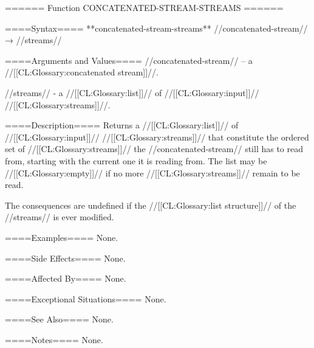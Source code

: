 ====== Function CONCATENATED-STREAM-STREAMS ======

====Syntax====
**concatenated-stream-streams** //concatenated-stream// → //streams//

====Arguments and Values====
//concatenated-stream// -- a //[[CL:Glossary:concatenated stream]]//.

//streams// - a //[[CL:Glossary:list]]// of //[[CL:Glossary:input]]// //[[CL:Glossary:streams]]//.

====Description====
Returns a //[[CL:Glossary:list]]// of //[[CL:Glossary:input]]// //[[CL:Glossary:streams]]// that constitute the ordered set of //[[CL:Glossary:streams]]// the //concatenated-stream// still has to read from, starting with the current one it is reading from. The list may be //[[CL:Glossary:empty]]// if no more //[[CL:Glossary:streams]]// remain to be read.

The consequences are undefined if the //[[CL:Glossary:list structure]]// of the //streams// is ever modified.

====Examples====
None.

====Side Effects====
None.

====Affected By====
None.

====Exceptional Situations====
None.

====See Also====
None.

====Notes====
None.

